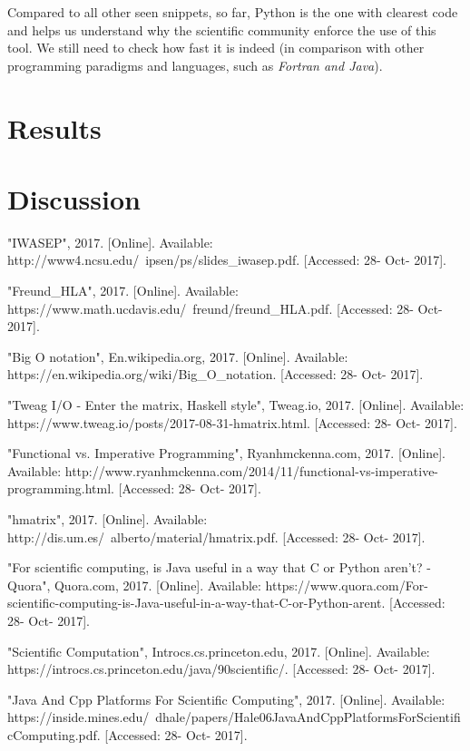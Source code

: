 \documentclass[conference]{IEEEtran}
\begin{document}
Compared to all other seen snippets, so far, Python is the one with clearest code and helps us understand why the scientific community enforce the use of this tool. We still need to check how fast it is indeed (in comparison with other programming paradigms and languages, such as \textit{Fortran and Java}).

\section{Results}

\section{Discussion}

\begin{thebibliography}{00}
 "IWASEP", 2017. [Online]. Available: http://www4.ncsu.edu/~ipsen/ps/slides\_iwasep.pdf. [Accessed: 28- Oct- 2017].

 "Freund\_HLA", 2017. [Online]. Available: https://www.math.ucdavis.edu/~freund/freund\_HLA.pdf. [Accessed: 28- Oct- 2017].

 "Big O notation", En.wikipedia.org, 2017. [Online]. Available: https://en.wikipedia.org/wiki/Big\_O\_notation. [Accessed: 28- Oct- 2017].

 "Tweag I/O - Enter the matrix, Haskell style", Tweag.io, 2017. [Online]. Available: https://www.tweag.io/posts/2017-08-31-hmatrix.html. [Accessed: 28- Oct- 2017].

 "Functional vs. Imperative Programming", Ryanhmckenna.com, 2017. [Online]. Available: http://www.ryanhmckenna.com/2014/11/functional-vs-imperative-programming.html. [Accessed: 28- Oct- 2017].

 "hmatrix", 2017. [Online]. Available: http://dis.um.es/~alberto/material/hmatrix.pdf. [Accessed: 28- Oct- 2017].

 "For scientific computing, is Java useful in a way that C or Python aren't? - Quora", Quora.com, 2017. [Online]. Available: https://www.quora.com/For-scientific-computing-is-Java-useful-in-a-way-that-C-or-Python-arent. [Accessed: 28- Oct- 2017].

 "Scientific Computation", Introcs.cs.princeton.edu, 2017. [Online]. Available: https://introcs.cs.princeton.edu/java/90scientific/. [Accessed: 28- Oct- 2017].

 "Java And Cpp Platforms For Scientific Computing", 2017. [Online]. Available: https://inside.mines.edu/~dhale/papers/Hale06JavaAndCppPlatformsForScientificComputing.pdf. [Accessed: 28- Oct- 2017].


\end{thebibliography}
\end{document}
